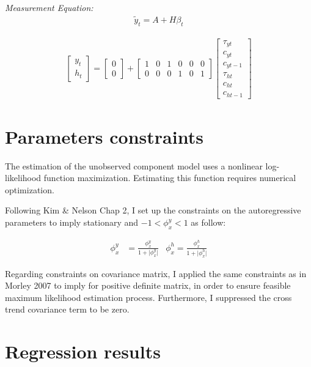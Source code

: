 \documentclass[fleqn]{article}
\begin{document}
\begin{outline}[enumerate]
\textit{Measurement Equation:}
\begin{align}
\tilde{y}_t = A + H\beta_t
\end{align}

\begin{align*}
\begin{bmatrix}
y_t	\\
h_t
\end{bmatrix}
=
\begin{bmatrix}
0	\\
0
\end{bmatrix}
+
\begin{bmatrix}
1	& 0	& 1	& 0	& 0 & 0 \\
0	& 0 & 0 & 1 & 0 & 1
\end{bmatrix}
\begin{bmatrix}
\tau_{yt}	\\
c_{yt}		\\
c_{yt-1}	\\
\tau_{ht}	\\
c_{ht}		\\
c_{ht-1}
\end{bmatrix}
\end{align*}
\pagebreak
\section{Parameters constraints}

The estimation of the unobserved component model uses a nonlinear log-likelihood function maximization. Estimating this function requires numerical optimization.


Following Kim \& Nelson Chap 2, I set up the constraints on the autoregressive parameters to imply stationary and $-1<\phi^{y}_{x}<1$ as follow:

\begin{align*}
\phi^{y}_{x} &= \frac{\phi^{y}_{x}}{1+|{\phi^{y}_{x}|}} &\phi^{h}_{x} = \frac{\phi^{h}_{x}}{1+|{\phi^{h}_{x}|}}
\end{align*}

\vspace{5mm} %

Regarding constraints on covariance matrix, I applied the same constraints as in Morley 2007 to imply for positive definite matrix, in order to ensure feasible maximum likelihood estimation process. Furthermore, I suppressed the cross trend covariance term to be zero.



\section{Regression results}


\end{outline}
\end{document}
